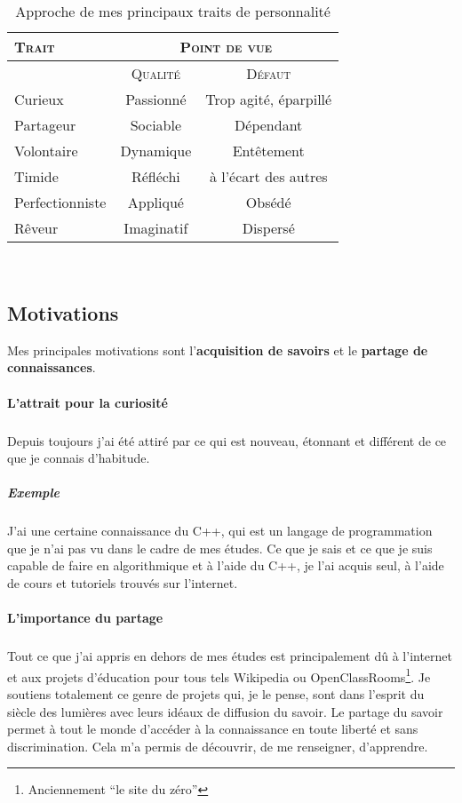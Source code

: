 \documentclass[a4paper,12pt, draft]{report}
\newcommand{\tabTitle}[1]{\hfill{} \textsc{#1} \hfill{} }
\begin{document}
\begin{table}[h]
  \begin{tabular}{|l|c|c|}
    \hline

  \tabTitle{Trait} & \multicolumn{2}{c|}{\tabTitle{Point de vue}} \\
\hline
 & \tabTitle{Qualité} & \tabTitle{Défaut} \\
\hline
  Curieux & Passionné & Trop agité, éparpillé \\
  \hline
  Partageur & Sociable & Dépendant\\
  \hline
  Volontaire & Dynamique & Entêtement \\
  \hline
  Timide & Réfléchi & à l'écart des autres \\
  \hline
  Perfectionniste & Appliqué & Obsédé \\
  \hline
  Rêveur & Imaginatif & Dispersé \\
  \hline


    
  \end{tabular}\\
\caption{Approche de mes principaux traits de personnalité}
\end{table}


\subsection{Motivations}
Mes principales motivations sont  l'\textbf{acquisition de savoirs} et 
le \textbf{partage de connaissances}. 

\paragraph{L'attrait pour la curiosité}
\subparagraph{}
Depuis toujours j'ai été attiré par ce qui est nouveau, étonnant et différent de ce que je connais d'habitude.
\subparagraph{Exemple}
J'ai une certaine connaissance du C++, qui est un langage de programmation que je n'ai pas vu dans le cadre de mes études.  Ce que je sais et ce que je suis capable de faire en algorithmique et à l'aide du C++, je l'ai acquis seul, à l'aide de cours et tutoriels trouvés sur l'internet. 

 

\paragraph{L'importance du partage}
\subparagraph{}
Tout ce que j'ai appris en dehors de mes études est principalement dû à l'internet et aux projets d'éducation pour tous tels Wikipedia ou OpenClassRooms\footnote{Anciennement ``le site du zéro''}.
Je soutiens totalement ce genre de projets qui, je le pense, sont dans l'esprit du siècle des lumières avec leurs idéaux de diffusion du savoir. Le partage du savoir permet à tout le monde d'accéder à la connaissance en toute liberté et sans discrimination. Cela m'a permis de découvrir, de me renseigner, d'apprendre. 
\end{document}
